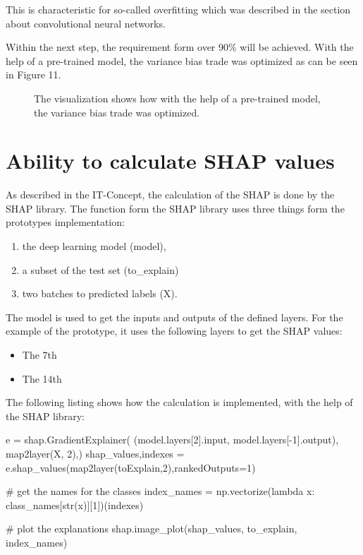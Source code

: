 This is characteristic for so-called overfitting which was described in the section about convolutional neural networks. 

Within the next step, the requirement form over 90\% will be achieved. With the help of a pre-trained model, the variance bias trade was optimized as can be seen in Figure 11.

\begin{figure}[htp]
	\centering
	\caption{The visualization shows how with the help of a pre-trained model, the variance bias trade was optimized.}
	\label{fig:acc-simple-mode.png}
\end{figure}

\section{Ability to calculate SHAP values}

As described in the IT-Concept, the calculation of the SHAP is done by the SHAP library. The function form the SHAP library uses three things form the prototypes implementation:

\begin{enumerate}
\item the deep learning model (model),
\item a subset of the test set (to\_explain)
\item two batches to predicted labels (X).
\end{enumerate}

The model is used to get the inputs and outputs of the defined layers. For the example of the prototype, it uses the following layers to get the SHAP values:

\begin{itemize}
\item The 7th 
\item The 14th 
\end{itemize}

The following listing shows how the calculation is implemented, with the help of the SHAP library:

\begin{python}[label={pred}, caption={Predictions of the pre-trained VGG-16 Architecture CNN model}]
e = shap.GradientExplainer(
(model.layers[2].input, model.layers[-1].output), map2layer(X, 2),)
shap_values,indexes = e.shap_values(map2layer(toExplain,2),rankedOutputs=1)

# get the names for the classes
index_names = np.vectorize(lambda x: class_names[str(x)][1])(indexes)

# plot the explanations
shap.image_plot(shap_values, to_explain, index_names)
\end{python}

